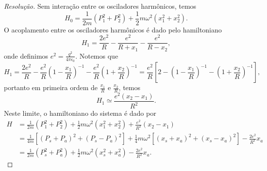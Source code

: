 \begin{proof}[Resolução]
    Sem interação entre os osciladores harmônicos, temos
    \begin{equation*}
        H_0 = \frac{1}{2m}(P_1^2 + P_2^2) + \frac{1}{2}m \omega^2 (x_1^2 + x_2^2).
    \end{equation*}
    O acoplamento entre os osciladores harmônicos é dado pelo hamiltoniano
    \begin{equation*}
        H_1 = \frac{2e^2}{R} - \frac{e^2}{R+x_1} - \frac{e^2}{R - x_2},
    \end{equation*}
    onde definimos \(e^2 = \frac{q^2}{4\pi \epsilon_0}\). Notemos que
    \begin{equation*}
        H_1 = \frac{2e^2}{R} - \frac{e^2}{R} \left(1 - \frac{x_1}{R}\right)^{-1} - \frac{e^2}{R}\left(1 + \frac{x_2}{R}\right)^{-1} = \frac{e^2}{R}\left[2 - \left(1 - \frac{x_1}{R}\right)^{-1} - \left(1 + \frac{x_2}{R}\right)^{-1}\right],
    \end{equation*}
    portanto em primeira ordem de \(\frac{x_1}{R}\) e \(\frac{x_2}{R}\), temos
    \begin{equation*}
        H_1 \simeq \frac{e^2(x_2 - x_1)}{R^2}.
    \end{equation*}
    Neste limite, o hamiltoniano do sistema é dado por
    \begin{align*}
        H &= \frac{1}{2m}(P_1^2 + P_2^2) + \frac12 m \omega^2(x_1^2 + x_2^2) + \frac{e^2}{R^2}(x_2 - x_1)\\
          &= \frac{1}{4m}\left[(P_s + P_a)^2 + (P_s - P_a)^2\right] + \frac14 m \omega^2\left[(x_s + x_a)^2 + (x_s - x_a)^2\right] - \frac{2e^2}{R^2} x_a\\
          &= \frac{1}{2m}\left(P_s^2 + P_a^2\right) + \frac{1}{2}m \omega^2 \left(x_s^2 + x_a^2\right) - \frac{2e^2}{R^2} x_a.
    \end{align*}
\end{proof}
